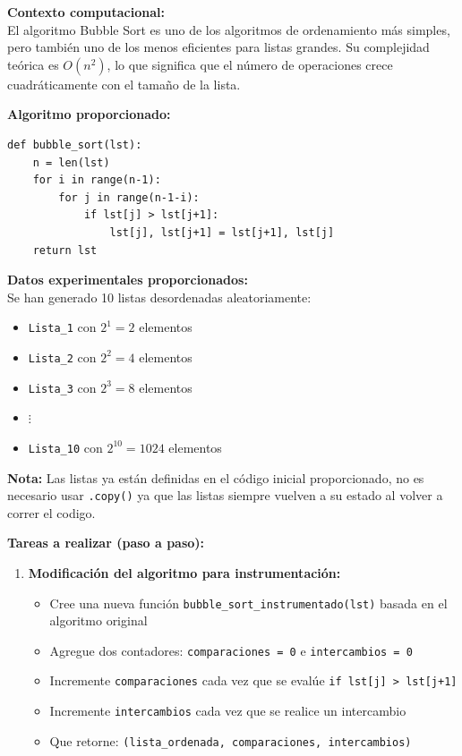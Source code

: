 \documentclass[10pt]{article}
\begin{document}
\begin{tcolorbox}[title={Pregunta 3 – Análisis de Complejidad del Algoritmo Bubble Sort}]

\noindent\textbf{Contexto computacional:}\\
El algoritmo Bubble Sort es uno de los algoritmos de ordenamiento más simples, pero también uno de los menos eficientes para listas grandes. Su complejidad teórica es $O(n^2)$, lo que significa que el número de operaciones crece cuadráticamente con el tamaño de la lista.


\noindent\textbf{Algoritmo proporcionado:}
\begin{verbatim}
def bubble_sort(lst):
    n = len(lst)
    for i in range(n-1):
        for j in range(n-1-i):
            if lst[j] > lst[j+1]:
                lst[j], lst[j+1] = lst[j+1], lst[j]
    return lst
\end{verbatim}


\noindent\textbf{Datos experimentales proporcionados:}\\
Se han generado 10 listas desordenadas aleatoriamente:
\begin{itemize}
  \item \texttt{Lista\_1} con $2^1 = 2$ elementos
  \item \texttt{Lista\_2} con $2^2 = 4$ elementos
  \item \texttt{Lista\_3} con $2^3 = 8$ elementos
  \item $\vdots$
  \item \texttt{Lista\_10} con $2^{10} = 1024$ elementos
\end{itemize}


\noindent\textbf{Nota:} Las listas ya están definidas en el código inicial proporcionado, no es necesario usar \texttt{.copy()} ya que las listas siempre vuelven a su estado al volver a correr el codigo.

\noindent\textbf{Tareas a realizar (paso a paso):}

\begin{enumerate}
  \item \textbf{Modificación del algoritmo para instrumentación:}
  \begin{itemize}
    \item Cree una nueva función \texttt{bubble\_sort\_instrumentado(lst)} basada en el algoritmo original
    \item Agregue dos contadores: \texttt{comparaciones = 0} e \texttt{intercambios = 0}
    \item Incremente \texttt{comparaciones} cada vez que se evalúe \texttt{if lst[j] > lst[j+1]}
    \item Incremente \texttt{intercambios} cada vez que se realice un intercambio
    \item Que retorne: \texttt{(lista\_ordenada, comparaciones, intercambios)}
  \end{itemize}
  

\end{enumerate}
\end{tcolorbox}
\end{document}
